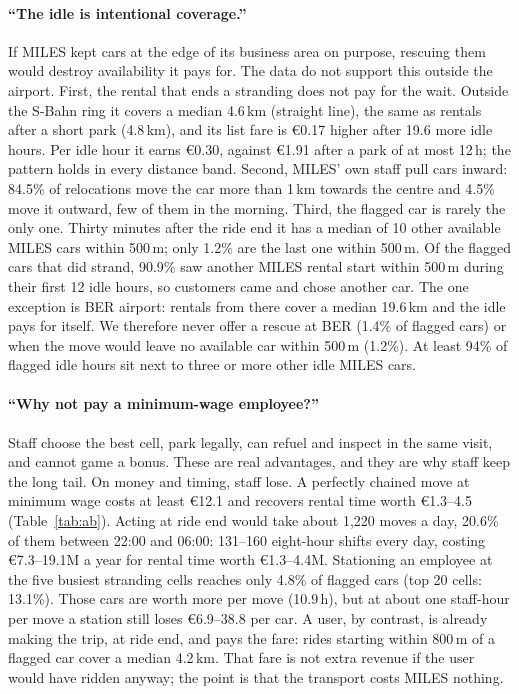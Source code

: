 \documentclass[11pt,a4paper]{article}
\newcommand{\eur}[1]{\euro{}#1}
\begin{document}
\paragraph{``The idle is intentional coverage.''}
If MILES kept cars at the edge of its business area on purpose, rescuing them would destroy availability it pays for. The data do not support this outside the airport. First, the rental that ends a stranding does not pay for the wait. Outside the S-Bahn ring it covers a median 4.6\,km (straight line), the same as rentals after a short park (4.8\,km), and its list fare is \eur{0.17} higher after 19.6 more idle hours. Per idle hour it earns \eur{0.30}, against \eur{1.91} after a park of at most 12\,h; the pattern holds in every distance band. Second, MILES' own staff pull cars inward: 84.5\% of relocations move the car more than 1\,km towards the centre and 4.5\% move it outward, few of them in the morning. Third, the flagged car is rarely the only one. Thirty minutes after the ride end it has a median of 10 other available MILES cars within 500\,m; only 1.2\% are the last one within 500\,m. Of the flagged cars that did strand, 90.9\% saw another MILES rental start within 500\,m during their first 12 idle hours, so customers came and chose another car. The one exception is BER airport: rentals from there cover a median 19.6\,km and the idle pays for itself. We therefore never offer a rescue at BER (1.4\% of flagged cars) or when the move would leave no available car within 500\,m (1.2\%). At least 94\% of flagged idle hours sit next to three or more other idle MILES cars.

\paragraph{``Why not pay a minimum-wage employee?''}
Staff choose the best cell, park legally, can refuel and inspect in the same visit, and cannot game a bonus. These are real advantages, and they are why staff keep the long tail. On money and timing, staff lose. A perfectly chained move at minimum wage costs at least \eur{12.1} and recovers rental time worth \eur{1.3}--4.5 (Table~\ref{tab:ab}). Acting at ride end would take about 1{,}220 moves a day, 20.6\% of them between 22:00 and 06:00: 131--160 eight-hour shifts every day, costing \eur{7.3}--19.1M a year for rental time worth \eur{1.3}--4.4M. Stationing an employee at the five busiest stranding cells reaches only 4.8\% of flagged cars (top 20 cells: 13.1\%). Those cars are worth more per move (10.9\,h), but at about one staff-hour per move a station still loses \eur{6.9}--38.8 per car. A user, by contrast, is already making the trip, at ride end, and pays the fare: rides starting within 800\,m of a flagged car cover a median 4.2\,km. That fare is not extra revenue if the user would have ridden anyway; the point is that the transport costs MILES nothing.
\end{document}
